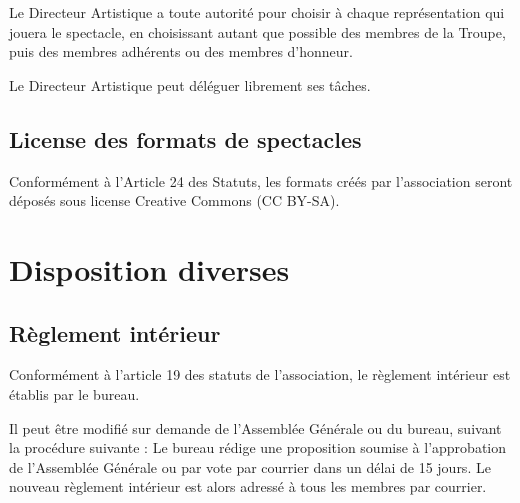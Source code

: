\documentclass[a4paper,french,10pt]{article}
\begin{document}
Le Directeur Artistique a toute autorité pour choisir à chaque représentation qui jouera le spectacle, en choisissant autant que possible des membres de la Troupe, puis des membres adhérents ou des membres d'honneur.

Le Directeur Artistique peut déléguer librement ses tâches.

\subsection{License des formats de spectacles}
Conformément à l'Article 24 des Statuts, les formats créés par l'association seront déposés sous license Creative Commons (CC BY-SA).


\section{Disposition diverses}
\subsection{Règlement intérieur}
Conformément à l'article 19 des statuts de l'association, le règlement intérieur est établis par le bureau.

Il peut être modifié sur demande de l'Assemblée Générale ou du bureau, suivant la procédure suivante :
Le bureau rédige une proposition soumise à l'approbation de l'Assemblée Générale ou par vote par courrier dans un délai de 15 jours.
Le nouveau règlement intérieur est alors adressé à tous les membres par courrier.
\end{document}
